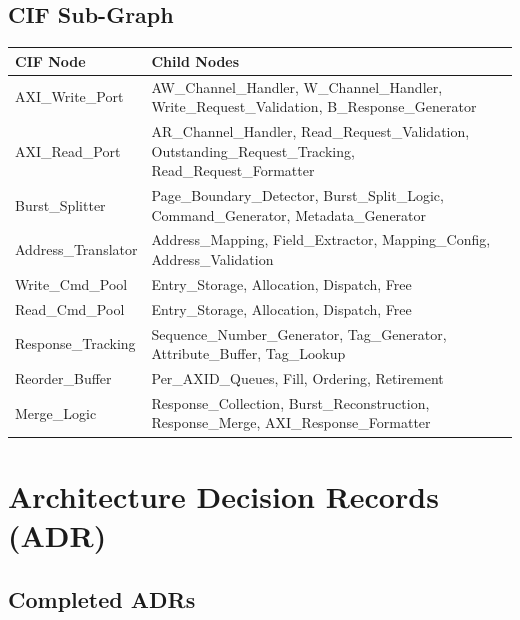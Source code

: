 \documentclass[10pt,a4paper]{article}
\newcommand{\Th}[1]{\cellcolor{thbg}\textbf{\small\color{acc1}#1}}
\newcommand{\RA}{\rowcolor{white}}
\newcommand{\RB}{\rowcolor{altbg}}
\begin{document}
\subsection{CIF Sub-Graph}

\begin{center}
\begin{tabularx}{\linewidth}{@{} l l @{}}
\toprule
\Th{CIF Node} & \Th{Child Nodes} \\
\midrule
\RA AXI\_Write\_Port & AW\_Channel\_Handler, W\_Channel\_Handler, Write\_Request\_Validation, B\_Response\_Generator \\
\RB AXI\_Read\_Port  & AR\_Channel\_Handler, Read\_Request\_Validation, Outstanding\_Request\_Tracking, Read\_Request\_Formatter \\
\RA Burst\_Splitter  & Page\_Boundary\_Detector, Burst\_Split\_Logic, Command\_Generator, Metadata\_Generator \\
\RB Address\_Translator & Address\_Mapping, Field\_Extractor, Mapping\_Config, Address\_Validation \\
\RA Write\_Cmd\_Pool & Entry\_Storage, Allocation, Dispatch, Free \\
\RB Read\_Cmd\_Pool  & Entry\_Storage, Allocation, Dispatch, Free \\
\RA Response\_Tracking & Sequence\_Number\_Generator, Tag\_Generator, Attribute\_Buffer, Tag\_Lookup \\
\RB Reorder\_Buffer  & Per\_AXID\_Queues, Fill, Ordering, Retirement \\
\RA Merge\_Logic     & Response\_Collection, Burst\_Reconstruction, Response\_Merge, AXI\_Response\_Formatter \\
\bottomrule
\end{tabularx}
\end{center}

\section{Architecture Decision Records (ADR)}

\subsection{Completed ADRs}
\end{document}
